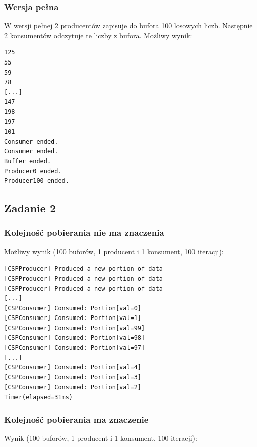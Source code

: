 \documentclass[11pt]{article}
\begin{document}
    \hypertarget{wersja-peux142na}{%
\subsubsection{Wersja pełna}\label{wersja-peux142na}}

W wersji pełnej 2 producentów zapisuje do bufora 100 losowych liczb.
Następnie 2 konsumentów odczytuje te liczby z bufora. Możliwy wynik:

\begin{verbatim}
125
55
59
78
[...]
147
198
197
101
Consumer ended.
Consumer ended.
Buffer ended.
Producer0 ended.
Producer100 ended.
\end{verbatim}

    \hypertarget{zadanie-2}{%
\subsection{Zadanie 2}\label{zadanie-2}}

    \hypertarget{kolejnoux15bux107-pobierania-nie-ma-znaczenia}{%
\subsubsection{Kolejność pobierania nie ma
znaczenia}\label{kolejnoux15bux107-pobierania-nie-ma-znaczenia}}

Możliwy wynik (100 buforów, 1 producent i 1 konsument, 100 iteracji):

\begin{verbatim}
[CSPProducer] Produced a new portion of data
[CSPProducer] Produced a new portion of data
[CSPProducer] Produced a new portion of data
[...]
[CSPConsumer] Consumed: Portion[val=0]
[CSPConsumer] Consumed: Portion[val=1]
[CSPConsumer] Consumed: Portion[val=99]
[CSPConsumer] Consumed: Portion[val=98]
[CSPConsumer] Consumed: Portion[val=97]
[...]
[CSPConsumer] Consumed: Portion[val=4]
[CSPConsumer] Consumed: Portion[val=3]
[CSPConsumer] Consumed: Portion[val=2]
Timer(elapsed=31ms)
\end{verbatim}

    \hypertarget{kolejnoux15bux107-pobierania-ma-znaczenie}{%
\subsubsection{Kolejność pobierania ma
znaczenie}\label{kolejnoux15bux107-pobierania-ma-znaczenie}}

Wynik (100 buforów, 1 producent i 1 konsument, 100 iteracji):
\end{document}
